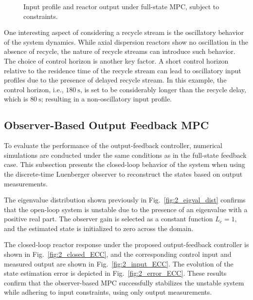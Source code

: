 \begin{figure}[!htbp]
    \centering
    
    \caption{Input profile and reactor output under full-state MPC, subject to constraints.}
    \label{fig:2_input}
\end{figure}

One interesting aspect of considering a recycle stream is the oscillatory behavior of the system dynamics. While axial dispersion reactors show no oscillation in the absence of recycle, the nature of recycle streams can introduce such behavior. The choice of control horizon is another key factor. A short control horizon relative to the residence time of the recycle stream can lead to oscillatory input profiles due to the presence of delayed recycle stream. In this example, the control horizon, i.e., $180~\mathrm{s}$, is set to be considerably longer than the recycle delay, which is $80~\mathrm{s}$; resulting in a non-oscillatory input profile.

\subsection{Observer-Based Output Feedback MPC}

To evaluate the performance of the output-feedback controller, numerical simulations are conducted under the same conditions as in the full-state feedback case. This subsection presents the closed-loop behavior of the system when using the discrete-time Luenberger observer to reconstruct the states based on output measurements.

The eigenvalue distribution shown previously in Fig.~\ref{fig:2_eigval_dist} confirms that the open-loop system is unstable due to the presence of an eigenvalue with a positive real part. The observer gain is selected as a constant function $L_c = 1$, and the estimated state is initialized to zero across the domain. %

The closed-loop reactor response under the proposed output-feedback controller is shown in Fig.~\ref{fig:2_closed_ECC}, and the corresponding control input and measured output are shown in Fig.~\ref{fig:2_input_ECC}. The evolution of the state estimation error is depicted in Fig.~\ref{fig:2_error_ECC}. These results confirm that the observer-based MPC successfully stabilizes the unstable system while adhering to input constraints, using only output measurements.

